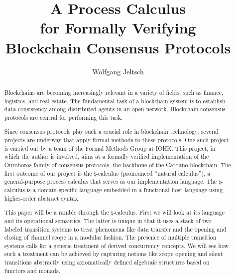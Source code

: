 \documentclass{llncs}
\begin{document}
\title{A Process Calculus\\for Formally Verifying\\Blockchain Consensus Protocols}
\author{Wolfgang Jeltsch}
\maketitle

\begin{abstract}

Blockchains are becoming increasingly relevant in a variety of fields, such as finance, logistics,
and real estate. The fundamental task of a blockchain system is to establish data consistency among
distributed agents in an open network. Blockchain consensus protocols are central for performing
this task.

Since consensus protocols play such a crucial role in blockchain technology, several projects are
underway that apply formal methods to these protocols. One such project is carried out by a team of
the Formal Methods Group at IOHK. This project, in which the author is involved, aims at a formally
verified implementation of the Ouroboros family of consensus protocols, the backbone of the Cardano
blockchain. The first outcome of our project is the $\natural$-calculus (pronounced ``natural
calculus''), a general-purpose process calculus that serves as our implementation language. The
$\natural$-calculus is a domain-specific language embedded in a functional host language using
higher-order abstract syntax.

This paper will be a ramble through the $\natural$-calculus. First we will look at its language and
its operational semantics. The latter is unique in that it uses a stack of two labeled transition
systems to treat phenomena like data transfer and the opening and closing of channel scope in a
modular fashion. The presence of multiple transition systems calls for a generic treatment of
derived concurrency concepts. We will see how such a treatment can be achieved by capturing notions
like scope opening and silent transitions abstractly using axiomatically defined algebraic
structures based on functors and monads.


\end{abstract}





\end{document}
